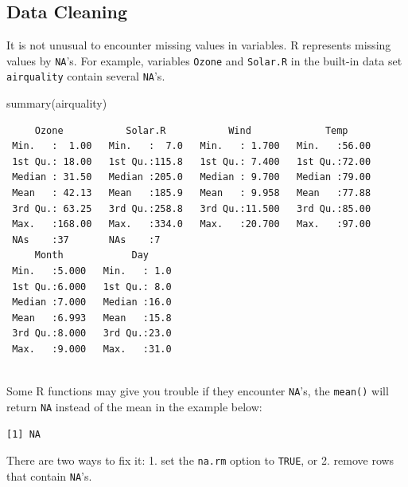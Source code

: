 \documentclass[
  letterpaper,
  DIV=11,
  numbers=noendperiod]{scrreprt}
\newenvironment{Shaded}{\begin{snugshade}}{\end{snugshade}}
\newcommand{\FunctionTok}[1]{\textcolor[rgb]{0.28,0.35,0.67}{#1}}
\newcommand{\NormalTok}[1]{\textcolor[rgb]{0.00,0.23,0.31}{#1}}
\newcommand{\SpecialCharTok}[1]{\textcolor[rgb]{0.37,0.37,0.37}{#1}}
\begin{document}
\subsection{Data Cleaning}\label{data-cleaning}

It is not unusual to encounter missing values in variables. R represents
missing values by \texttt{NA}'s. For example, variables \texttt{Ozone}
and \texttt{Solar.R} in the built-in data set \texttt{airquality}
contain several \texttt{NA}'s.

\begin{Shaded}
\begin{Highlighting}[]
\FunctionTok{summary}\NormalTok{(airquality)}
\end{Highlighting}
\end{Shaded}

\begin{verbatim}
     Ozone           Solar.R           Wind             Temp      
 Min.   :  1.00   Min.   :  7.0   Min.   : 1.700   Min.   :56.00  
 1st Qu.: 18.00   1st Qu.:115.8   1st Qu.: 7.400   1st Qu.:72.00  
 Median : 31.50   Median :205.0   Median : 9.700   Median :79.00  
 Mean   : 42.13   Mean   :185.9   Mean   : 9.958   Mean   :77.88  
 3rd Qu.: 63.25   3rd Qu.:258.8   3rd Qu.:11.500   3rd Qu.:85.00  
 Max.   :168.00   Max.   :334.0   Max.   :20.700   Max.   :97.00  
 NAs    :37       NAs    :7                                       
     Month            Day      
 Min.   :5.000   Min.   : 1.0  
 1st Qu.:6.000   1st Qu.: 8.0  
 Median :7.000   Median :16.0  
 Mean   :6.993   Mean   :15.8  
 3rd Qu.:8.000   3rd Qu.:23.0  
 Max.   :9.000   Max.   :31.0  
                               
\end{verbatim}

Some R functions may give you trouble if they encounter \texttt{NA}'s,
the \texttt{mean()} will return \texttt{NA} instead of the mean in the
example below:

\begin{Shaded}
\end{Shaded}

\begin{verbatim}
[1] NA
\end{verbatim}

There are two ways to fix it: 1. set the \texttt{na.rm} option to
\texttt{TRUE}, or 2. remove rows that contain \texttt{NA}'s.
\end{document}
